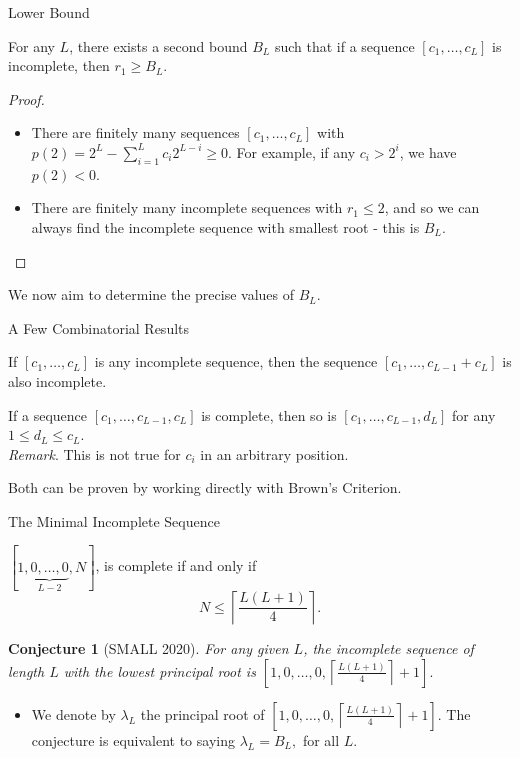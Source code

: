 \documentclass{beamer}
\newtheorem*{conjecture}{Conjecture}
\begin{document}
\begin{frame}{Lower Bound}
	\begin{lemma}[SMALL 2020]
	For any $L $, there exists a second bound $B_{L}$ such that if a sequence $[c_1,\ldots , c_{L}]$ is incomplete, then  $r_1\geq B_{L}$.
\end{lemma}
\pause
\begin{proof}
	\begin{itemize}
	\item
		There are finitely many sequences $[ c_1,\ldots , c_{L} ]$ with $p(2)=2^{L}-\sum_{i=1}^{L}c_{i}2^{L-i}\geq 0$. \pause  For example, if any $c_{i}> 2^{i}$, we have $p(2)< 0$.
		\pause
\item
	 There are finitely many incomplete sequences with $r_1\leq 2$, and so we can always find the incomplete sequence with smallest root - this is $B_{L}$.\end{itemize} 
\end{proof}
\pause
We now aim to determine the precise values of $B_{L}$.
\end{frame}
\begin{frame}{A Few Combinatorial Results}
	\begin{theorem}[SMALL 2020]
	If $[c_1,\ldots , c_{L}]$ is any incomplete sequence, then the sequence $[c_1,\ldots , c_{L-1}+c_{L}]$ is also incomplete.
\end{theorem}
\pause
\bigskip
	\begin{theorem}[SMALL 2020]
If a sequence $[c_1, \ldots, c_{L-1}, c_L]$ is complete, then so is $[c_1, \ldots, c_{L-1}, d_L]$ for any $1 \le d_L \leq c_L$.\\
    \emph{Remark}. This is not true for $c_i$ in an arbitrary position.
\end{theorem}
\pause
Both can be proven by working directly with Brown's Criterion.
\end{frame}
\begin{frame}{The Minimal Incomplete Sequence}
	    \begin{theorem}[SMALL 2020]
		    $[1, \underbrace{0, \ldots, 0}_{L-2}, N]$, is complete if and only if \vspace{-0.2in}
            \[
		    N \leq \left\lceil \frac{L(L+1)}{4}  \right\rceil.
            \]
	    \end{theorem}

	    \pause
\begin{conjecture}[SMALL 2020]
For any given $L$, the incomplete sequence of length $L$ with the lowest principal root is $[1, 0, \ldots, 0, \left\lceil \frac{L(L+1)}{4}\right\rceil+1].$
\end{conjecture}
\pause
\begin{itemize}
\item

	We denote by $\lambda _{L}$ the principal root of $[1,0,\ldots , 0, \left\lceil \frac{L(L+1)}{4} \right\rceil +1].$ The conjecture is equivalent to saying $\lambda _{L}=B_{L},$ for all $L.$
\end{itemize}
\end{frame}
\end{document}
